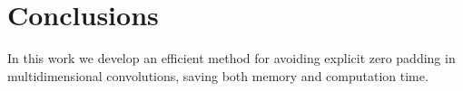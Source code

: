 \documentclass[final]{siamltex}
\begin{document}
\section{Conclusions}
In this work we develop an efficient method for avoiding explicit zero
padding in multidimensional convolutions, saving both memory and
computation time.



\end{document}
